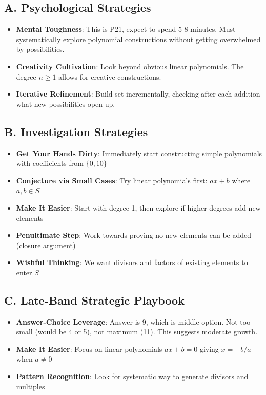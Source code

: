 \documentclass[12pt]{article}
\begin{document}
\begin{strategicbox}
\subsection*{A. Psychological Strategies}
\begin{itemize}[leftmargin=*]
    \item \textbf{Mental Toughness}: This is P21, expect to spend 5-8 minutes. Must systematically explore polynomial constructions without getting overwhelmed by possibilities.
    \item \textbf{Creativity Cultivation}: Look beyond obvious linear polynomials. The degree $n \geq 1$ allows for creative constructions.
    \item \textbf{Iterative Refinement}: Build set incrementally, checking after each addition what new possibilities open up.
\end{itemize}

\subsection*{B. Investigation Strategies}
\begin{itemize}[leftmargin=*]
    \item \textbf{Get Your Hands Dirty}: Immediately start constructing simple polynomials with coefficients from $\{0, 10\}$
    \item \textbf{Conjecture via Small Cases}: Try linear polynomials first: $ax + b$ where $a, b \in S$
    \item \textbf{Make It Easier}: Start with degree 1, then explore if higher degrees add new elements
    \item \textbf{Penultimate Step}: Work towards proving no new elements can be added (closure argument)
    \item \textbf{Wishful Thinking}: We want divisors and factors of existing elements to enter $S$
\end{itemize}

\subsection*{C. Late-Band Strategic Playbook}
\begin{itemize}[leftmargin=*]
    \item \textbf{Answer-Choice Leverage}: Answer is 9, which is middle option. Not too small (would be 4 or 5), not maximum (11). This suggests moderate growth.
    \item \textbf{Make It Easier}: Focus on linear polynomials $ax + b = 0$ giving $x = -b/a$ when $a \neq 0$
    \item \textbf{Pattern Recognition}: Look for systematic way to generate divisors and multiples
\end{itemize}


\end{strategicbox}
\end{document}
